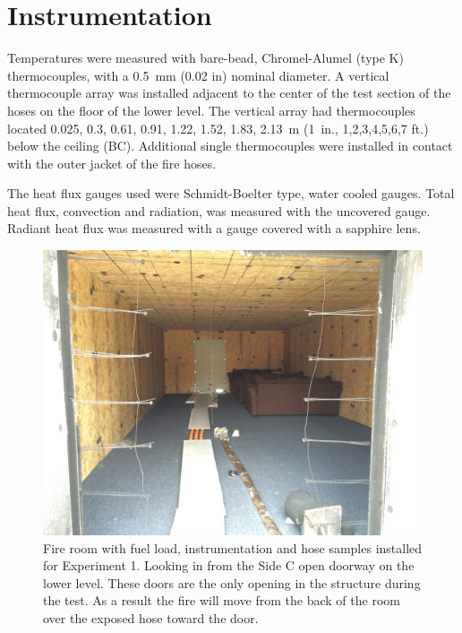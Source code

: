 \documentclass[letterpaper,11pt]{texMemo} %
\begin{document}
\section{Instrumentation}
Temperatures were measured with bare-bead, Chromel-Alumel (type K) thermocouples, with a 0.5~mm (0.02 in) nominal diameter. A vertical thermocouple array was installed adjacent to the center of the test section of the hoses on the floor of the lower level. The vertical array had thermocouples located 0.025, 0.3, 0.61, 0.91, 1.22, 1.52, 1.83, 2.13~m (1~in., 1,2,3,4,5,6,7 ft.) below the ceiling (BC).  Additional single thermocouples were installed in contact with the outer jacket of the fire hoses.  

The heat flux gauges used were Schmidt-Boelter type, water cooled gauges.  Total heat flux, convection and radiation, was measured with the uncovered gauge. Radiant heat flux was measured with a gauge covered with a sapphire lens.  

\begin{figure}[!ht]
\centering
\includegraphics[width=0.8\columnwidth]{../Figures/Hose_Figures/test_setup_1}
\caption{Fire room with fuel load, instrumentation and hose samples installed for Experiment 1. Looking in from the Side C open doorway on the lower level. These doors are the only opening in the structure during the test. As a result the fire will move from the back of the room over the exposed hose toward the door.}
\label{fig:test_setup_1}
\end{figure}
\end{document}
